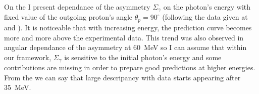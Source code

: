      On the  I present dependance of the asymmetry
     $\Sigma_\gamma$ on the photon's energy with fixed value
     of the outgoing proton's angle $\theta_p = 90^\circ$ 
     (following the data given at \cite{delbianco_1981} and \cite{depascale_asymmetry}).
     It is noticeable that with increasing energy, the prediction curve
     becomes more and more above the experimental data. This trend
     was also observed in angular dependance of the asymmetry at 60~MeV
     so I can assume that within our framework, 
     $\Sigma_\gamma$ is sensitive to the initial photon's energy and some 
     contributions are missing in order to prepare good predictions
     at higher energies. From the  we can say that
     large descripancy with data starts appearing after 
     35~MeV. 


